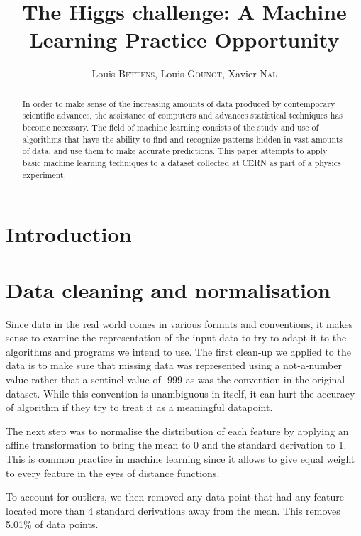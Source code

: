 \documentclass[10pt,conference,compsocconf]{IEEEtran}
\begin{document}
\title{The Higgs challenge: A Machine Learning Practice Opportunity}

\author{
	Louis \textsc{Bettens}, Louis \textsc{Gounot}, Xavier \textsc{Nal}
}

\maketitle

\begin{abstract}
	In order to make sense of the increasing amounts of data produced by contemporary scientific advances, the assistance of computers and advances statistical techniques has become necessary.
	The field of machine learning consists of the study and use of algorithms that have the ability to find and recognize patterns hidden in vast amounts of data, and use them to make accurate predictions.
	This paper attempts to apply basic machine learning techniques to a dataset collected at CERN as part of a physics experiment.
\end{abstract}

\section{Introduction}

\section{Data cleaning and normalisation}
\label{sec:data-cleaning}

Since data in the real world comes in various formats and conventions, it makes sense to examine the representation of the input data to try to adapt it to the algorithms and programs we intend to use.
The first clean-up we applied to the data is to make sure that missing data was represented using a not-a-number value rather that a sentinel value of -999 as was the convention in the original dataset.
\cite{higgsml14}
While this convention is unambiguous in itself, it can hurt the accuracy of algorithm if they try to treat it as a meaningful datapoint.

The next step was to normalise the distribution of each feature by applying an affine transformation to bring the mean to 0 and the standard derivation to 1. This is common practice in machine learning since it allows to give equal weight to every feature in the eyes of distance functions.

To account for outliers, we then removed any data point that had any feature located more than 4 standard derivations away from the mean. This removes 5.01\% of data points.
\end{document}

